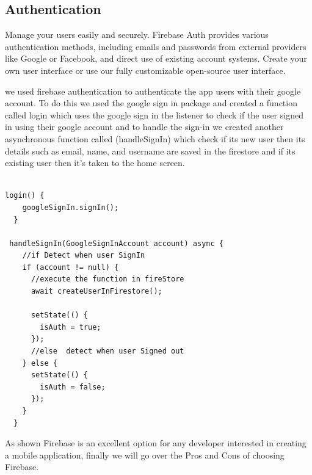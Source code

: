 \subsection{Authentication}
Manage your users easily and securely. Firebase Auth provides various authentication methods, including emails and passwords from external providers like Google or Facebook, and direct use of existing account systems. Create your own user interface or use our fully customizable open-source user interface.

we used firebase authentication to authenticate the app users with their google account. To do this we used the google sign in package and created a function called login which uses the google sign in the listener to check if the user signed in using their google account and to handle the sign-in we created another asynchronous function called (handleSignIn)  which check if its new user then its details such as email, name, and username are saved in the firestore and if its existing user then it's taken to the home screen.

\begin{verbatim}

login() {
    googleSignIn.signIn();
  }

 handleSignIn(GoogleSignInAccount account) async {
    //if Detect when user SignIn
    if (account != null) {
      //execute the function in fireStore
      await createUserInFirestore();

      setState(() {
        isAuth = true;
      });
      //else  detect when user Signed out
    } else {
      setState(() {
        isAuth = false;
      });
    }
  }
\end{verbatim}
As shown Firebase is an excellent option for any developer interested in creating a mobile application, finally we will go over the Pros and Cons of choosing Firebase.

